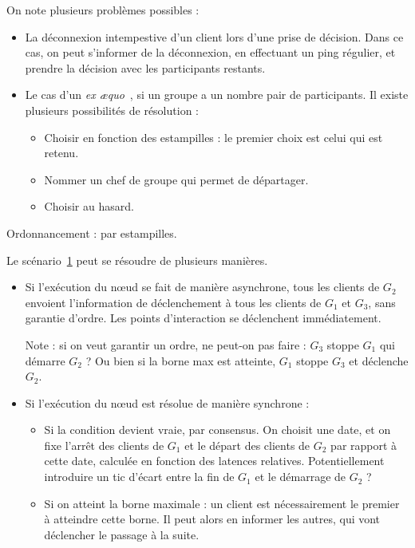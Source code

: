 \documentclass{article}
\newcommand\triggers{points d'interaction\xspace}
\begin{document}
On note plusieurs problèmes possibles : 
\begin{itemize}
    \item La déconnexion intempestive d'un client lors d'une prise de décision. 
    Dans ce cas, on peut s'informer de la déconnexion, en effectuant un ping régulier, et prendre la décision avec les participants restants. 
    \item Le cas d'un \textit{ex æquo}~, si un groupe a un nombre pair de participants.
    Il existe plusieurs possibilités de résolution : 
    \begin{itemize}
        \item Choisir en fonction des estampilles : le premier choix est celui qui est retenu.
        \item Nommer un chef de groupe qui permet de départager.
        \item Choisir au hasard.
    \end{itemize}
\end{itemize}
Ordonnancement : par estampilles.

\begin{figure}[h]
    \centering
    \begin{tikzpicture}
    
    \end{tikzpicture}
    \label{scenar.trigger-1}
\end{figure}

Le scénario~\ref{scenar.trigger-1} peut se résoudre de plusieurs manières.

\begin{itemize}
    \item Si l'exécution du nœud se fait de manière asynchrone, tous les clients de $G_2$ envoient l'information de déclenchement à tous les clients de $G_1$ et $G_3$, sans garantie d'ordre.
    Les \triggers se déclenchent immédiatement.
    
    Note : si on veut garantir un ordre, ne peut-on pas faire : $G_3$ stoppe $G_1$ qui démarre $G_2$ ? Ou bien si la borne max est atteinte, $G_1$ stoppe $G_3$ et déclenche $G_2$.
    
    \item Si l'exécution du nœud est résolue de manière synchrone : 
    \begin{itemize}
        \item Si la condition devient vraie, par consensus. 
        On choisit une date, et on fixe l'arrêt des clients de $G_1$ et le départ des clients de $G_2$ par rapport à cette date, calculée en fonction des latences relatives. 
        Potentiellement introduire un tic d'écart entre la fin de $G_1$ et le démarrage de $G_2$ ?
        \item Si on atteint la borne maximale : un client est nécessairement le premier à atteindre cette borne.
        Il peut alors en informer les autres, qui vont déclencher le passage à la suite.
    \end{itemize}
\end{itemize}
\end{document}
